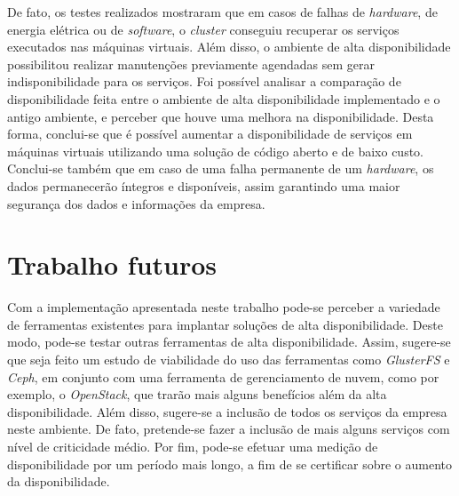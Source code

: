De fato, os testes realizados mostraram que em casos de falhas de \textit{hardware}, de energia elétrica ou de \textit{software}, 
o \textit{cluster} conseguiu recuperar os serviços executados nas máquinas virtuais. Além disso, o ambiente de alta disponibilidade possibilitou
realizar manutenções previamente agendadas sem gerar indisponibilidade para os serviços.
Foi possível analisar a comparação de disponibilidade feita entre o ambiente de alta disponibilidade implementado e o antigo ambiente,
e perceber que houve uma melhora na disponibilidade. 
Desta forma, conclui-se que é possível aumentar a disponibilidade de serviços em máquinas virtuais utilizando uma solução 
de código aberto e de baixo custo.
Conclui-se também que em caso de uma falha permanente de um \textit{hardware}, os dados permanecerão íntegros e disponíveis, assim garantindo 
uma maior segurança dos dados e informações da empresa.


\section{Trabalho futuros}
\label{section:trabalhosfuturos}

Com a implementação apresentada neste trabalho pode-se perceber a variedade de ferramentas existentes para implantar soluções de alta 
disponibilidade. Deste modo, pode-se testar outras ferramentas de alta disponibilidade. Assim, sugere-se que seja feito um estudo de
viabilidade do uso das ferramentas como \textit{GlusterFS} e \textit{Ceph}, em conjunto com uma ferramenta de gerenciamento de nuvem, como
por exemplo, o \textit{OpenStack}, que trarão mais alguns benefícios além da alta disponibilidade.
Além disso, sugere-se a inclusão de todos os serviços da empresa neste ambiente. De fato, pretende-se fazer a inclusão de mais alguns
serviços com nível de criticidade médio.
Por fim, pode-se efetuar uma medição de disponibilidade por um período mais longo, a fim de se certificar sobre o aumento da
disponibilidade.

